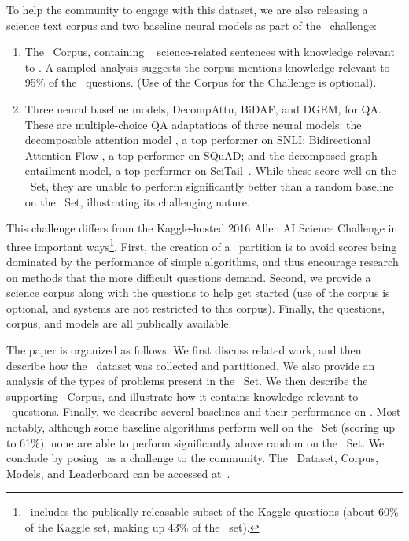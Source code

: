 To help the community to engage with this dataset, we are also releasing a science text corpus and two baseline neural models
as part of the \ASC~challenge:
\begin{enumerate}
\item The \ASC~Corpus, containing \BUSCSIZE~
  science-related sentences with knowledge relevant to \ASC.
  A sampled analysis suggests the corpus mentions knowledge relevant to 
   95\% of the \Challenge~questions. (Use of the Corpus for the Challenge is optional).
\item Three neural baseline models, DecompAttn, BiDAF, and DGEM, for QA. These are
multiple-choice QA adaptations of three neural models: the decomposable attention model
\cite{parikh2016decomposable}, a top performer on SNLI; Bidirectional Attention Flow \cite{Seo2016BidirectionalAF}, a top performer on SQuAD; and the decomposed graph entailment model, a top performer on SciTail~\cite{khot2018scitail}.
While these score well on the \Additional~Set, they are
unable to perform significantly better than a random baseline
on the \Challenge~Set, illustrating its challenging nature.
\end{enumerate}
This challenge differs from the Kaggle-hosted 2016 Allen AI Science Challenge \cite{schoenick2017moving}
in three important ways\footnote{
\ASC~includes the publically releasable subset of the Kaggle questions (about 60\% of the Kaggle set, making up 43\% of the \ASC~set).}. First, the creation of a \Challenge~partition
is to avoid scores being dominated by the performance of simple algorithms,
and thus encourage research on methods that the more difficult questions demand.
Second, we provide a science corpus along with the questions to help
get started (use of the corpus is optional, and systems are not
restricted to this corpus). Finally, the questions, corpus, and models
are all publically available.

The paper is organized as follows. We first discuss related work, and then
describe how the \ASC~dataset was collected and partitioned. We also provide an analysis
of the types of problems present in the \Challenge~Set. We then describe
the supporting \ASC~Corpus, and illustrate how it contains knowledge
relevant to \Challenge~questions. Finally, we describe several baselines
and their performance on \ASC. Most notably, although some baseline algorithms
perform well on the \Additional~Set (scoring up to 61\%), none are able to
perform significantly above random on the \Challenge~Set. We conclude by
posing \ASC~as a challenge to the community. The \ASC~Dataset, Corpus, Models,
and Leaderboard can be accessed at~\ascurl.

